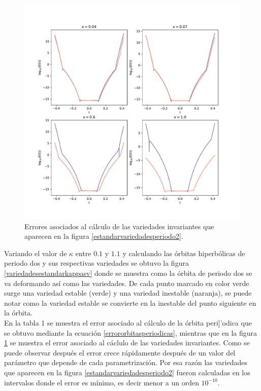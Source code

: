 \begin{figure}
	\centering
	\includegraphics[scale=0.7]{erroresvariedadesestandarperiodo2}
	\caption{Errores asociados al c\'alculo de las variedades invariantes que aparecen en la figura \ref{estandarvariedadesperiodo2}.}
	\label{erroresvariedadesestandarperiodo2}
\end{figure}
Variando el valor de $\kappa$ entre $0.1$ y $1.1$ y calculando las \'orbitas hiperb\'olicas de periodo dos y sus respectivas variedades se obtuvo la figura  \ref{variedadesestandarkappasv} donde se muestra como la \'orbita de periodo dos se va deformando as\'i como las variedades. De cada punto marcado en color verde surge una variedad estable (verde) y una variedad inestable (naranja), se puede notar como la variedad estable se convierte en la inestable del punto siguiente en la \'orbita.\\

En la tabla 1 se muestra el error asociado al c\'alculo de la \'orbita peri]'odica que se obtuvo mediante la ecuaci\'on  \eqref{errororbitasperiodicas}, mientras que en la figura \ref{erroresvariedadesestandarperiodo2} se muestra el error asociado al c\'aclulo de las variedades invariantes. Como se puede observar despu\'es el error crece r\'apidamente despu\'es de un valor del par\'ametro que depende de cada parametrizaci\'on. Por esa raz\'on las variedades que aparecen en la figura \ref{estandarvariedadesperiodo2} fueron calculadas en los intervalos donde el error es m\'inimo, es decir menor a  un orden $10^{-10}$. 

